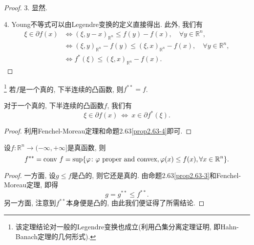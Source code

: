 \begin{proposition}
\begin{proof}
        3. 显然.
    
        4. Young不等式可以由Legendre变换的定义直接得出. 此外, 我们有 
        \begin{align*}
            \xi \in \partial f(x) &\Longleftrightarrow (\xi, y - x)_{\mathbb{R}^n} \leq f(y) - f(x), \quad \forall y \in \mathbb{R}^n, \\ 
            &\Longleftrightarrow (\xi, y)_{\mathbb{R}^n} - f(y) \leq (\xi, x)_{\mathbb{R}^n} - f(x), \quad \forall y \in \mathbb{R}^n, \\ 
            &\Longleftrightarrow f^*(\xi) \leq (\xi, x)_{\mathbb{R}^n} - f(x).
        \end{align*}
    \end{proof}
\end{proposition}

\begin{theorem}\footnote{该定理结论对一般的Legendre变换也成立(利用凸集分离定理证明, 即Hahn-Banach定理的几何形式).}
    若$f$是一个真的, 下半连续的凸函数, 则$f^{**} = f$.
\end{theorem}

\begin{corollary}\label{coro2.65}
    对于一个真的, 下半连续的凸函数$f$, 我们有 
    \begin{equation*}
        \xi \in \partial f(x) \ \Longleftrightarrow \ x \in \partial f^*(\xi).
    \end{equation*}
    \begin{proof}
        利用Fenchel-Moreau定理和命题2.63\eqref{prop2.63-4}即可.
    \end{proof}
\end{corollary}

\begin{corollary}
    设$f\colon \mathbb{R}^n \rightarrow (-\infty, +\infty]$是真函数, 则 
    \begin{equation*}
        f^{**} = {\rm conv}\ f = \sup\{\varphi \colon \varphi\ \text{proper and convex}, \varphi (x) \leq f(x), \forall x \in \mathbb{R}^n\}.
    \end{equation*}
    \begin{proof}
        一方面, 设$g \leq f$是凸的, 则它还是真的. 由命题2.63\eqref{prop2.63-3}和Fenchel-Moreau定理, 即得 
        \begin{equation*}
            g = g^{**} \leq f^{**}.
        \end{equation*}
        另一方面, 注意到$f^{**}$本身便是凸的, 由此我们便证得了所需结论.
    \end{proof}
\end{corollary}

